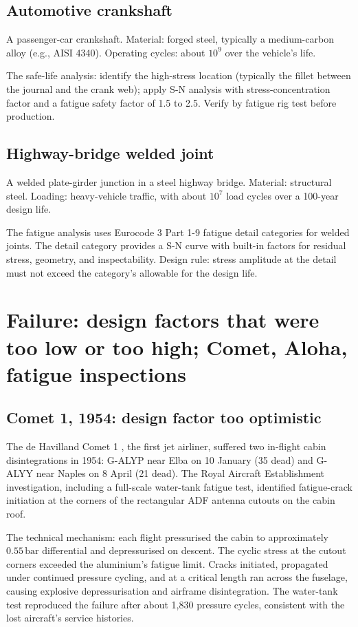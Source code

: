\subsection{Automotive crankshaft}

A passenger-car crankshaft. Material: forged steel, typically a medium-carbon alloy (e.g., AISI 4340). Operating cycles: about $10^9$ over the vehicle's life.

The safe-life analysis: identify the high-stress location (typically the fillet between the journal and the crank web); apply S-N analysis with stress-concentration factor and a fatigue safety factor of 1.5 to 2.5. Verify by fatigue rig test before production.

\subsection{Highway-bridge welded joint}

A welded plate-girder junction in a steel highway bridge. Material: structural steel. Loading: heavy-vehicle traffic, with about $10^7$ load cycles over a 100-year design life.

The fatigue analysis uses Eurocode 3 Part 1-9 fatigue detail categories for welded joints. The detail category provides a S-N curve with built-in factors for residual stress, geometry, and inspectability. Design rule: stress amplitude at the detail must not exceed the category's allowable for the design life.

\section{Failure: design factors that were too low or too high; Comet, Aloha, fatigue inspections}

\subsection{Comet 1, 1954: design factor too optimistic}

The de Havilland Comet 1 \cite{acc:cohen-comet-report-1955}, the first jet airliner, suffered two in-flight cabin disintegrations in 1954: G-ALYP near Elba on 10 January (35 dead) and G-ALYY near Naples on 8 April (21 dead). The Royal Aircraft Establishment investigation, including a full-scale water-tank fatigue test, identified fatigue-crack initiation at the corners of the rectangular ADF antenna cutouts on the cabin roof.

The technical mechanism: each flight pressurised the cabin to approximately $0.55\,\si{\bar}$ differential and depressurised on descent. The cyclic stress at the cutout corners exceeded the aluminium's fatigue limit. Cracks initiated, propagated under continued pressure cycling, and at a critical length ran across the fuselage, causing explosive depressurisation and airframe disintegration. The water-tank test reproduced the failure after about 1,830 pressure cycles, consistent with the lost aircraft's service histories.


